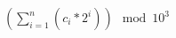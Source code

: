 \documentclass[12pt,a4paper]{article}
\begin{document}
$(\sum_{i=1}^{n}(c_{i} * 2^{i}))\mod10^{3}$



\end{document}
